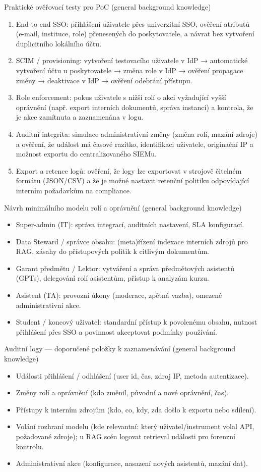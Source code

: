 Praktické ověřovací testy pro PoC (general background knowledge)
\begin{enumerate}
  \item End‑to‑end SSO: přihlášení uživatele přes univerzitní SSO, ověření atributů (e‑mail, instituce, role) přenesených do poskytovatele, a návrat bez vytvoření duplicitního lokálního účtu.
  \item SCIM / provisioning: vytvoření testovacího uživatele v IdP → automatické vytvoření účtu u poskytovatele → změna role v IdP → ověření propagace změny → deaktivace v IdP → ověření odebrání přístupu.
  \item Role enforcement: pokus uživatele s nižší rolí o akci vyžadující vyšší oprávnění (např. export interních dokumentů, správa instancí) a kontrola, že je akce zamítnuta a zaznamenána v logu.
  \item Auditní integrita: simulace administrativní změny (změna rolí, mazání zdroje) a ověření, že událost má časové razítko, identifikaci uživatele, originační IP a možnost exportu do centralizovaného SIEMu.
  \item Export a retence logů: ověření, že logy lze exportovat v strojově čitelném formátu (JSON/CSV) a že je možné nastavit retenční politiku odpovídající interním požadavkům na compliance.
\end{enumerate}

Návrh minimálního modelu rolí a oprávnění (general background knowledge)
\begin{itemize}
  \item Super‑admin (IT): správa integrací, auditních nastavení, SLA konfigurací.
  \item Data Steward / správce obsahu: (meta)řízení indexace interních zdrojů pro RAG, zásahy do přístupových politik k citlivým dokumentům.
  \item Garant předmětu / Lektor: vytváření a správa předmětových asistentů (GPTs), delegování rolí asistentům, přístup k analyzám kurzu.
  \item Asistent (TA): provozní úkony (moderace, zpětná vazba), omezené administrativní akce.
  \item Student / koncový uživatel: standardní přístup k povolenému obsahu, nutnost přihlášení přes SSO a povinnost akceptovat podmínky používání.
\end{itemize}

Auditní logy — doporučené položky k zaznamenávání (general background knowledge)
\begin{itemize}
  \item Události přihlášení / odhlášení (user id, čas, zdroj IP, metoda autentizace).
  \item Změny rolí a oprávnění (kdo změnil, původní a nové oprávnění, čas).
  \item Přístupy k interním zdrojům (kdo, co, kdy, zda došlo k exportu nebo sdílení).
  \item Volání rozhraní modelu (kde relevantní: který uživatel/instrument volal API, požadované zdroje); u RAG scén logovat retrieval události pro forenzní kontrolu.
  \item Administrativní akce (konfigurace, nasazení nových asistentů, mazání dat).
\end{itemize}

